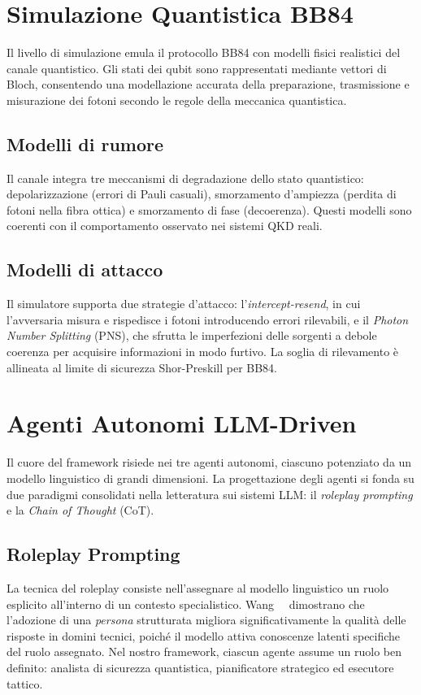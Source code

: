 \section{Simulazione Quantistica BB84}
\label{sec:bb84-simulation}

Il livello di simulazione emula il protocollo BB84 con modelli fisici realistici del canale quantistico. Gli stati dei qubit sono rappresentati mediante vettori di Bloch, consentendo una modellazione accurata della preparazione, trasmissione e misurazione dei fotoni secondo le regole della meccanica quantistica.

\subsection{Modelli di rumore}
Il canale integra tre meccanismi di degradazione dello stato quantistico: depolarizzazione (errori di Pauli casuali), smorzamento d'ampiezza (perdita di fotoni nella fibra ottica) e smorzamento di fase (decoerenza). Questi modelli sono coerenti con il comportamento osservato nei sistemi QKD reali.

\subsection{Modelli di attacco}
Il simulatore supporta due strategie d'attacco: l'\emph{intercept-resend}, in cui l'avversaria misura e rispedisce i fotoni introducendo errori rilevabili, e il \emph{Photon Number Splitting} (PNS), che sfrutta le imperfezioni delle sorgenti a debole coerenza per acquisire informazioni in modo furtivo. La soglia di rilevamento è allineata al limite di sicurezza Shor-Preskill per BB84.

\section{Agenti Autonomi LLM-Driven}
\label{sec:agents}

Il cuore del framework risiede nei tre agenti autonomi, ciascuno potenziato da un modello linguistico di grandi dimensioni. La progettazione degli agenti si fonda su due paradigmi consolidati nella letteratura sui sistemi LLM: il \emph{roleplay prompting} e la \emph{Chain of Thought} (CoT).

\subsection*{Roleplay Prompting}
La tecnica del roleplay consiste nell'assegnare al modello linguistico un ruolo esplicito all'interno di un contesto specialistico. Wang~\etal~\cite{wang2023roleplay} dimostrano che l'adozione di una \emph{persona} strutturata migliora significativamente la qualità delle risposte in domini tecnici, poiché il modello attiva conoscenze latenti specifiche del ruolo assegnato. Nel nostro framework, ciascun agente assume un ruolo ben definito: analista di sicurezza quantistica, pianificatore strategico ed esecutore tattico.


